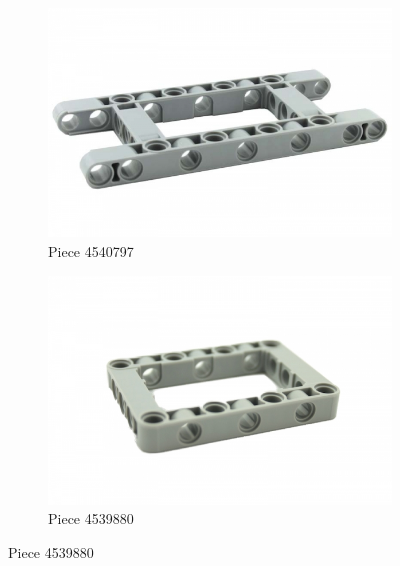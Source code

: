 \documentclass[11pt, a4paper, oneside]{article}
\begin{document}
		\begin{figure}[h!]
		\begin{subfigure}{.45\textwidth}
		  \centering
		  \includegraphics[scale=0.23]{img/Frame1.jpg}
		  \caption{Piece 4540797}
		\end{subfigure}%
		\begin{subfigure}{.45\textwidth}
		  \centering
		  \includegraphics[scale=0.23]{img/Frame2.jpg}
		  \caption{Piece 4539880}
		\end{subfigure}
		\end{figure}		
		
\end{document}
